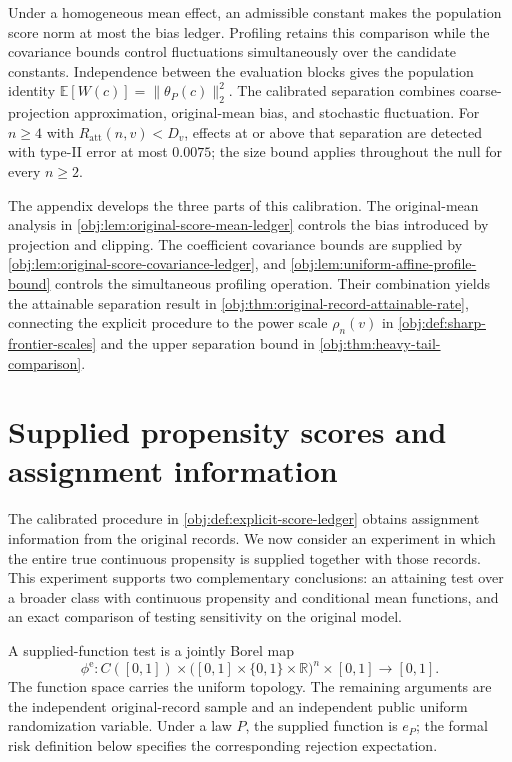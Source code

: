 \documentclass[11pt]{article}
\begin{document}
Under a homogeneous mean effect, an admissible constant makes the population score norm at most the bias ledger. Profiling retains this comparison while the covariance bounds control fluctuations simultaneously over the candidate constants. Independence between the evaluation blocks gives the population identity \(\mathbb E[W(c)]=\|\theta_P(c)\|_2^2\). The calibrated separation combines coarse-projection approximation, original-mean bias, and stochastic fluctuation. For \(n\ge4\) with \(R_{\mathrm{att}}(n,v)<D_v\), effects at or above that separation are detected with type-II error at most \(0.0075\); the size bound applies throughout the null for every \(n\ge2\).

The appendix develops the three parts of this calibration. The original-mean analysis in \cref{obj:lem:original-score-mean-ledger} controls the bias introduced by projection and clipping. The coefficient covariance bounds are supplied by \cref{obj:lem:original-score-covariance-ledger}, and \cref{obj:lem:uniform-affine-profile-bound} controls the simultaneous profiling operation. Their combination yields the attainable separation result in \cref{obj:thm:original-record-attainable-rate}, connecting the explicit procedure to the power scale \(\rho_n(v)\) in \cref{obj:def:sharp-frontier-scales} and the upper separation bound in \cref{obj:thm:heavy-tail-comparison}.


\section{Supplied propensity scores and assignment information}

The calibrated procedure in \cref{obj:def:explicit-score-ledger} obtains assignment information from the original records. We now consider an experiment in which the entire true continuous propensity is supplied together with those records. This experiment supports two complementary conclusions: an attaining test over a broader class with continuous propensity and conditional mean functions, and an exact comparison of testing sensitivity on the original model.

A supplied-function test  is a jointly Borel map
\[
\phi^{\mathrm e}:
C([0,1])\times
\bigl([0,1]\times\{0,1\}\times\mathbb R\bigr)^n
\times[0,1]\longrightarrow[0,1].
\]
The function space carries the uniform topology. The remaining arguments are the independent original-record sample and an independent public uniform randomization variable. Under a law \(P\), the supplied function is \(e_P\); the formal risk definition below specifies the corresponding rejection expectation.
\end{document}
